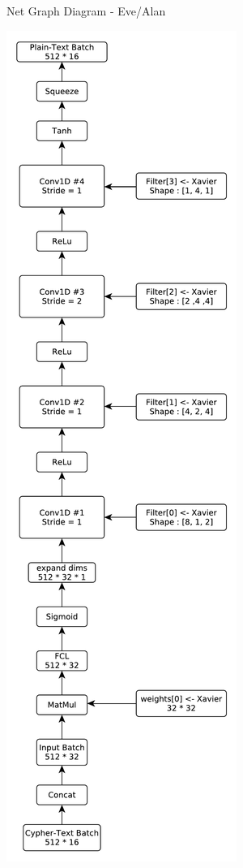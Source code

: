 \documentclass[12pt]{article}
\begin{document}
\newpage
\begin{blockfigure}{ Net Graph Diagram - Eve/Alan}
		\begin{center}
			\includegraphics[height=0.93\textheight]{Eve-Diagram}
		\end{center}
\end{blockfigure}
\end{document}
